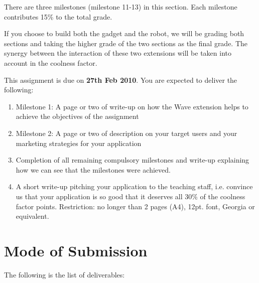 There are three milestones (milestone 11-13) in this section.  Each
milestone contributes 15\% to the total grade.

If you choose to build both the gadget and the robot, we will be
grading both sections and taking the higher grade of the two sections
as the final grade. The synergy between the interaction of these two
extensions will be taken into account in the coolness factor.

This assignment is due on \textbf{27th Feb 2010}. You
are expected to deliver the following:
\begin{enumerate}
    \item Milestone 1: A page or two of write-up on how the Wave extension helps
    to achieve the objectives of the assignment

    \item Milestone 2: A page or two of description on your target
    users and your marketing strategies for your application

    \item Completion of all remaining compulsory milestones and write-up explaining how we can see that the milestones were achieved.

    \item A short write-up pitching your application to
    the teaching staff, i.e. convince us that your application is so
    good that it deserves all 30\% of the coolness factor
    points. Restriction: no longer than 2 pages (A4), 12pt. font,
    Georgia or equivalent.
\end{enumerate}

\section{Mode of Submission}

The following is the list of deliverables:

